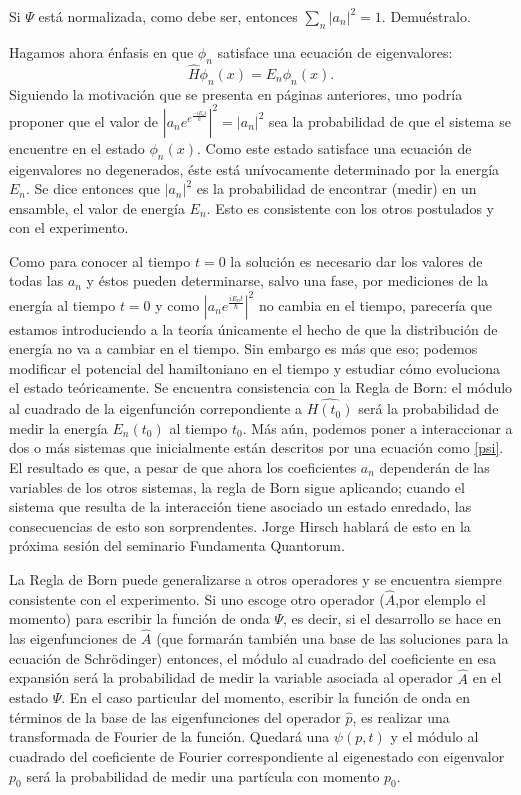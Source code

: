 \documentclass[10pt,letterpaper]{article}
\begin{document}
Si $\Psi$ está normalizada, como debe ser, entonces $\sum_n |a_n|^2 = 1$. Demuéstralo.

Hagamos ahora énfasis en que $\phi_n$ satisface una ecuación de eigenvalores:
\begin{equation}
\hat{H}\phi_n(x) = E_n\phi_n(x).
\label{H}
\end{equation}
Siguiendo la motivación que se presenta en páginas anteriores, uno podría proponer que el valor de $|a_ne^{e^{\frac{-iE_n t}{\hbar}}}|^2 = |a_n|^2$ sea la probabilidad de que el sistema se encuentre en el estado $\phi_n(x)$. Como este estado satisface una ecuación de eigenvalores no degenerados, éste está unívocamente determinado por la energía $E_n$. Se dice entonces que $|a_n|^2$ es la probabilidad de encontrar (medir) en un ensamble, el valor de energía $E_n$. Esto es consistente con los otros postulados y con el experimento.

Como para conocer al tiempo $t=0$ la solución es necesario dar los valores de todas las $a_n$ y éstos pueden determinarse, salvo una fase, por mediciones de la energía al tiempo $t=0$ y como $|a_ne^{\frac{iE_nt}{\hbar}}|^2$ no cambia en el tiempo, parecería que estamos introduciendo a la teoría únicamente el hecho de que la distribución de energía no va a cambiar en el tiempo. Sin embargo es más que eso; podemos modificar el potencial del hamiltoniano en el tiempo y estudiar cómo evoluciona el estado teóricamente. Se encuentra consistencia con la Regla de Born: el módulo al cuadrado de la eigenfunción correpondiente a $\hat{H(t_0)}$ será la probabilidad de medir la energía $E_n(t_0)$ al tiempo $t_0$. Más aún, podemos poner a interaccionar a dos o más sistemas que inicialmente están descritos por una ecuación como \eqref{psi}. El resultado es que, a pesar de que ahora los coeficientes $a_n$ dependerán de las variables de los otros sistemas, la regla de Born sigue aplicando; cuando el sistema que resulta de la interacción tiene asociado un estado enredado, las consecuencias de esto son sorprendentes. Jorge Hirsch hablará de esto en la próxima sesión del seminario Fundamenta Quantorum.

La Regla de Born puede generalizarse a otros operadores y se encuentra siempre consistente con el experimento. Si uno escoge otro operador ($\hat{A}$,por elemplo el momento) para escribir la función de onda $\Psi$, es decir, si el desarrollo se hace en las eigenfunciones de $\hat{A}$ (que formarán también una base de las soluciones para la ecuación de Schrödinger) entonces, el módulo al cuadrado del coeficiente en esa expansión será la probabilidad de medir la variable asociada al operador $\hat{A}$ en el estado $\Psi$. En el caso particular del momento, escribir la función de onda en términos de la base de las eigenfunciones del operador $\hat{p}$, es realizar una transformada de Fourier de la función. Quedará una $\psi(p,t)$ y el módulo al cuadrado del coeficiente de Fourier correspondiente al eigenestado con eigenvalor $p_0$ será la probabilidad de medir una partícula con momento $p_0$.
\end{document}
